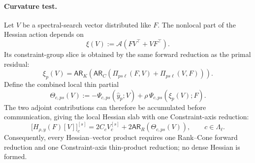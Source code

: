 \documentclass[11pt]{article}
\theoremstyle{definition}
\theoremstyle{remark}
\begin{document}
\paragraph{Curvature test.}
Let $V$ be a spectral-search vector distributed like $F$.  The nonlocal part of the
Hessian action depends on
\begin{equation}
    \xi(V):=\mathcal A(FV^\top+VF^\top).
\label{eq:directional-constraint-image}
\end{equation}
Its constraint-group slice is obtained by the same forward reduction as the
primal residual:
\begin{equation}
    \xi_p(V)=\mathsf{AR}_{K}\!\left(
       \mathsf{AR}_{C}\!\left(
          \Pi_{p s\ell}(F,V)+\Pi_{p s\ell}(V,F)
       \right)
    \right).
\label{eq:distributed-directional-image}
\end{equation}
Define the combined local thin partial
\begin{equation}
    \Theta_{c,ps}(V)
    :=-\Psi_{c,ps}(\widehat y_p;V)
      +\rho\,\Psi_{c,ps}(\xi_p(V);F).
\label{eq:combined-hessian-partial}
\end{equation}
The two adjoint contributions can therefore be accumulated before
communication, giving the local Hessian slab with one Constraint-axis
reduction:
\begin{equation}
    \bigl[H_{\rho,y}(F)[V]\bigr]_c^{[s]}
    =2C_cV_c^{[s]}
     +2\mathsf{AR}_{R}\!\left(\Theta_{c,ps}(V)\right),
    \qquad c\in\Lambda_\ell.
\label{eq:distributed-hessian-vector}
\end{equation}
Consequently, every Hessian--vector product requires one Rank--Cone forward
reduction and one Constraint-axis thin-product reduction; no dense Hessian is
formed.
\end{document}
